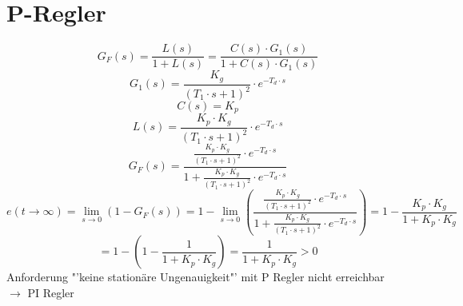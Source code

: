 \section{P-Regler}
\[ G_F(s) = \frac{L(s)}{1 + L(s)} = \frac{C(s) \cdot G_1(s)}{1 + C(s) \cdot G_1(s)} \]
\[ G_1(s) = \frac{K_g}{(T_1 \cdot s + 1)^2} \cdot e^{-T_d \cdot s} \]
\[ C(s) = K_p \]
\[ L(s) = \frac{K_p \cdot K_g}{(T_1 \cdot s + 1)^2} \cdot e^{-T_d \cdot s} \]
\[ G_F(s) = \frac{\frac{K_p \cdot K_g}{(T_1 \cdot s + 1)^2} \cdot e^{-T_d \cdot s}}
    {1 + \frac{K_p \cdot K_g}{(T_1 \cdot s + 1)^2} \cdot e^{-T_d \cdot s}}
\]
\[ e(t \to \infty) = \lim\limits_{s \to 0} (1 - G_F(s))
    = 1 - \lim\limits_{s \to 0} \left(\frac{\frac{K_p \cdot K_g}{(T_1 \cdot s + 1)^2} \cdot e^{-T_d \cdot s}}
        {1 + \frac{K_p \cdot K_g}{(T_1 \cdot s + 1)^2} \cdot e^{-T_d \cdot s}}\right)
    = 1 - \frac{K_p \cdot K_g}{1 + K_p \cdot K_g}
\]
\[
    = 1 - \left(1 - \frac{1}{1 + K_p \cdot K_g}\right)
    = \frac{1}{1 + K_p \cdot K_g} > 0
\]
Anforderung "'keine stationäre Ungenauigkeit"' mit P Regler nicht erreichbar \\
$\rightarrow$ PI Regler
